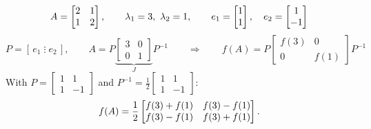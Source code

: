 \begin{example}
\[
A = \begin{bmatrix}2&1\\1&2\end{bmatrix}, \qquad
\lambda_1 = 3,\ \lambda_2 = 1,
\qquad e_1 = \begin{bmatrix}1\\1\end{bmatrix}, \quad e_2 = \begin{bmatrix}1\\-1\end{bmatrix}
\]
\[
P = [\,e_1 \;\vdots\; e_2\,], \qquad A = P\underbrace{\left[\begin{array}{c|c}3&0\\ \hline 0&1\end{array}\right]}_{J}P^{-1}
\qquad\Rightarrow\qquad
f(A) = P\left[\begin{array}{c|c} f(3) & 0\\ \hline 0 & f(1)\end{array}\right]P^{-1}
\]
With $P=\left[\begin{smallmatrix}1&1\\1&-1\end{smallmatrix}\right]$ and $P^{-1}=\frac12\left[\begin{smallmatrix}1&1\\1&-1\end{smallmatrix}\right]$:
\[
f(A) = \frac12\begin{bmatrix}f(3)+f(1) & f(3)-f(1)\\ f(3)-f(1) & f(3)+f(1)\end{bmatrix} .
\]
\end{example}


